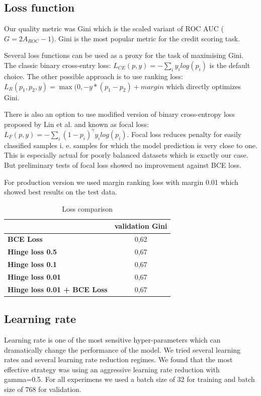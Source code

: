 \documentclass{sigkddExp}
\begin{document}
\subsection{Loss function}

Our quality metric was Gini which is the scaled variant of ROC AUC ($G = 2A_{ROC} - 1$). Gini is the most popular metric for the credit scoring task.

Several loss functions can be used as a proxy for the task of maximising Gini. The classic binary cross-entry loss: $L_{CE}(p, y) = - \sum_i y_ilog(p_i)$ is the default choice.
The other possible approach is to use ranking loss: $ L_R(p_1, p_2, y) = \max(0, -y * (p_1 - p_2) + margin $ which directly optimizes Gini.

There is also an option to use modified version of binary cross-entropy loss proposed by Lin et al.\cite{DBLP:journals/corr/abs-1708-02002} and known as focal loss: $L_F(p, y) = -\sum_i (1 - p_i)^\gamma y_i log(p_i)$. Focal loss reduces penalty for easily classified samples i. e. samples for which the model prediction is very close to one. This is especially actual for poorly balanced datasets which is exactly our case. But preliminary tests of focal loss showed no improvement against BCE loss.

For production version we used margin ranking loss with margin 0.01 which showed best results on the test data. 

\begin{table}
\caption{Loss comparison}
\begin{tabular}{ | l | c |  }
\hline
& \textbf{validation Gini} \\
\hline
\textbf{BCE Loss} & 0,62  \\
\textbf{Hinge loss 0.5} & 0,67  \\
\textbf{Hinge loss 0.1} & 0,67  \\
\textbf{Hinge loss 0.01} & 0,67  \\
\textbf{Hinge loss 0.01 + BCE Loss} & 0,67  \\
\hline
\end{tabular}
\label{tab4}
\end{table}

\subsection{Learning rate}

Learning rate is one of the most sensitive hyper-parameters which can dramatically change the performance of the model. We tried several learning rates and several learning rate reduction regimes. We found that the most effective strategy was using an aggressive learning rate reduction with gamma=0.5.
For all experimens we used a batch size of 32 for training and batch size of 768 for validation.
\end{document}
